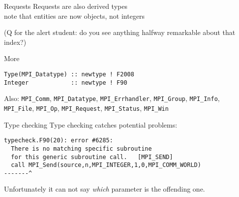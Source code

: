 \begin{numberedframe}{Requests}
  Requests are also derived types\\
  note that  entities are now objects, not integers


  (Q for the alert student: do you see anything halfway
  remarkable about that index?)
\end{numberedframe}

\begin{numberedframe}{More}
\begin{lstlisting}
Type(MPI_Datatype) :: newtype ! F2008
Integer            :: newtype ! F90
\end{lstlisting}

Also:
  \lstinline{MPI_Comm}, \lstinline{MPI_Datatype},
  \lstinline{MPI_Errhandler}, \lstinline{MPI_Group},
  \lstinline{MPI_Info}, \lstinline{MPI_File}, \lstinline{MPI_Op},
  \lstinline{MPI_Request}, \lstinline{MPI_Status}, \lstinline{MPI_Win}
\end{numberedframe}

\begin{numberedframe}{Type checking}
  Type checking catches potential problems:
\begin{verbatim}
typecheck.F90(20): error #6285: 
  There is no matching specific subroutine
  for this generic subroutine call.   [MPI_SEND]
  call MPI_Send(source,n,MPI_INTEGER,1,0,MPI_COMM_WORLD)
-------^
\end{verbatim}
Unfortunately it can not say \emph{which} parameter is the offending one.
\end{numberedframe}

\lstset{language=C}
